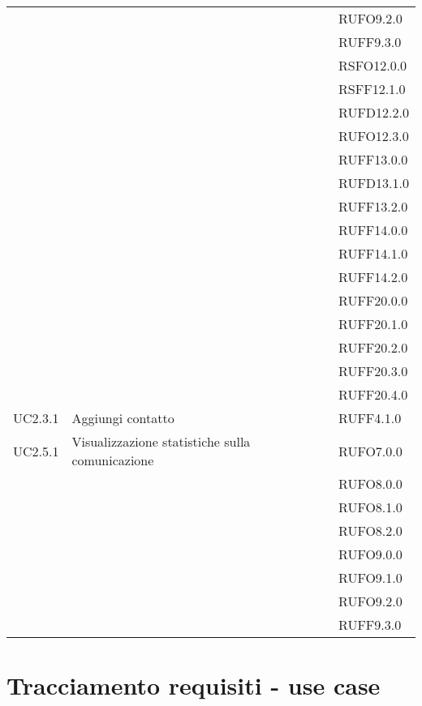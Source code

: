 \begin{center}
\begin{longtable}{lp{}l}
 &  & RUFO9.2.0 \\
 &  & RUFF9.3.0 \\
 &  & RSFO12.0.0 \\
 &  & RSFF12.1.0 \\
 &  & RUFD12.2.0 \\
 &  & RUFO12.3.0 \\
 &  & RUFF13.0.0 \\
 &  & RUFD13.1.0 \\
 &  & RUFF13.2.0 \\
 &  & RUFF14.0.0 \\
 &  & RUFF14.1.0 \\
 &  & RUFF14.2.0 \\
 &  & RUFF20.0.0 \\
 &  & RUFF20.1.0 \\
 &  & RUFF20.2.0 \\
 &  & RUFF20.3.0 \\
 &  & RUFF20.4.0 \\
UC2.3.1 & Aggiungi contatto & RUFF4.1.0 \\
UC2.5.1 & Visualizzazione statistiche sulla comunicazione & RUFO7.0.0 \\
 &  & RUFO8.0.0 \\
 &  & RUFO8.1.0 \\
 &  & RUFO8.2.0 \\
 &  & RUFO9.0.0 \\
 &  & RUFO9.1.0 \\
 &  & RUFO9.2.0 \\
 &  & RUFF9.3.0 \\
\bottomrule
\end{longtable}
\end{center}
\newpage\section{Tracciamento requisiti - use case}\label{sec:tracciamento}

